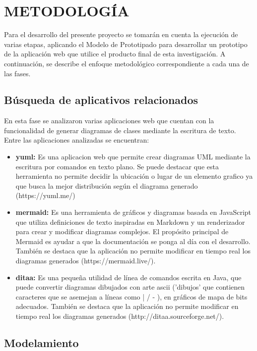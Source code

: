 \documentclass[12pt,a4paper,final, xcolor=table, table]{article}
\begin{document}
	\section{METODOLOGÍA}
	
	Para el desarrollo del presente proyecto se tomarán en cuenta la ejecución de varias etapas, aplicando el Modelo de Prototipado para desarrollar un prototipo de la aplicación web que utilice el producto final de esta investigación. A continuación, se describe el enfoque metodológico correspondiente a cada una de las fases. 
	
	\subsection{Búsqueda de aplicativos relacionados}
	
	En esta fase se analizaron varias aplicaciones web que cuentan con la funcionalidad de generar diagramas de clases mediante la escritura de texto. Entre las aplicaciones analizadas se encuentran:
	
	\begin{itemize}
		\item \textbf{yuml: }Es una aplicacion web que permite crear diagramas UML mediante la escritura por comandos en texto plano. Se puede destacar que esta herramienta no permite decidir la ubicación o lugar de un elemento grafico ya que busca la mejor distribución según el diagrama generado (https://yuml.me/)
		
		\item \textbf{mermaid: }Es una herramienta de gráficos y diagramas basada en JavaScript que utiliza definiciones de texto inspiradas en Markdown y un renderizador para crear y modificar diagramas complejos. El propósito principal de Mermaid es ayudar a que la documentación se ponga al día con el desarrollo. También se destaca que la aplicación no permite modificar en tiempo real los diagramas generados (https://mermaid.live/).
		
		\item \textbf{ditaa: }Es una pequeña utilidad de línea de comandos escrita en Java, que puede convertir diagramas dibujados con arte ascii ('dibujos' que contienen caracteres que se asemejan a líneas como | / - ), en gráficos de mapa de bits adecuados. También se destaca que la aplicación no permite modificar en tiempo real los diagramas generados (http://ditaa.sourceforge.net/). 
	\end{itemize}
	
	\subsection{Modelamiento}
	
\end{document}
